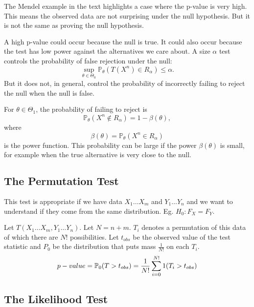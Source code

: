 \documentclass[10pt]{article}
\begin{document}
\begin{note}
    The Mendel example in the text highlights a case where the p-value is very high. This
    means the observed data are not surprising under the null hypothesis. But it
    is not the same as proving the null hypothesis.

    A high p-value could occur because the null is true. It could also occur
    because the test has low power against the alternatives we care about. A
    size $\alpha$ test controls the probability of false rejection under the
    null:
    \[
        \sup_{\theta \in \Theta_0} 
        \mathbb{P}_\theta(T(X^n) \in R_\alpha) \leq \alpha.
    \]
    But it does not, in general, control the probability of incorrectly failing
    to reject the null when the null is false.

    For $\theta \in \Theta_1$, the probability of failing to reject is
    \[
        \mathbb{P}_\theta(X^n \notin R_\alpha)
        = 1 - \beta(\theta),
    \]
    where
    \[
        \beta(\theta) = \mathbb{P}_\theta(X^n \in R_\alpha)
    \]
    is the power function. This probability can be large if the power
    $\beta(\theta)$ is small, for example when the true alternative is very
    close to the null.
\end{note}

\subsection{The Permutation Test}

This test is appropriate if we have data $X_1 \dots X_m$ and $Y_1 \dots Y_n$
and we want to understand if they come from the same distribution. Eg. $H_0: F_X
= F_Y$.

\begin{definition}
    Let $T(X_1 \dots X_m, Y_1 \dots Y_n)$. Let $N = n + m$. $T_i$ denotes a permutation of
    this data of which there are $N!$ possibilities. Let $t_{obs}$ be the
    observed value of the test statistic and $P_0$ be the distribution that
    puts mass $\frac{1}{N!}$ on each $T_i$.
    \[p-value = \P_0(T > t_{obs}) = \frac{1}{N!} \sum_{i=0}^{N!} 1(T_i > t_{obs}) \]
\end{definition}

\subsection{The Likelihood Test}

\begin{definition}
\end{definition}
\end{document}
